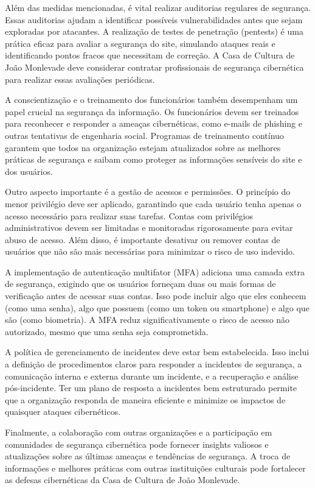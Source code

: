 Além das medidas mencionadas, é vital realizar auditorias regulares de segurança. Essas auditorias ajudam a identificar possíveis vulnerabilidades antes que sejam exploradas por atacantes. A realização de testes de penetração (pentests) é uma prática eficaz para avaliar a segurança do site, simulando ataques reais e identificando pontos fracos que necessitam de correção. A Casa de Cultura de João Monlevade deve considerar contratar profissionais de segurança cibernética para realizar essas avaliações periódicas.

A conscientização e o treinamento dos funcionários também desempenham um papel crucial na segurança da informação. Os funcionários devem ser treinados para reconhecer e responder a ameaças cibernéticas, como e-mails de phishing e outras tentativas de engenharia social. Programas de treinamento contínuo garantem que todos na organização estejam atualizados sobre as melhores práticas de segurança e saibam como proteger as informações sensíveis do site e dos usuários.

Outro aspecto importante é a gestão de acessos e permissões. O princípio do menor privilégio deve ser aplicado, garantindo que cada usuário tenha apenas o acesso necessário para realizar suas tarefas. Contas com privilégios administrativos devem ser limitadas e monitoradas rigorosamente para evitar abuso de acesso. Além disso, é importante desativar ou remover contas de usuários que não são mais necessárias para minimizar o risco de uso indevido.

A implementação de autenticação multifator (MFA) adiciona uma camada extra de segurança, exigindo que os usuários forneçam duas ou mais formas de verificação antes de acessar suas contas. Isso pode incluir algo que eles conhecem (como uma senha), algo que possuem (como um token ou smartphone) e algo que são (como biometria). A MFA reduz significativamente o risco de acesso não autorizado, mesmo que uma senha seja comprometida.

A política de gerenciamento de incidentes deve estar bem estabelecida. Isso inclui a definição de procedimentos claros para responder a incidentes de segurança, a comunicação interna e externa durante um incidente, e a recuperação e análise pós-incidente. Ter um plano de resposta a incidentes bem estruturado permite que a organização responda de maneira eficiente e minimize os impactos de quaisquer ataques cibernéticos.

Finalmente, a colaboração com outras organizações e a participação em comunidades de segurança cibernética pode fornecer insights valiosos e atualizações sobre as últimas ameaças e tendências de segurança. A troca de informações e melhores práticas com outras instituições culturais pode fortalecer as defesas cibernéticas da Casa de Cultura de João Monlevade.

